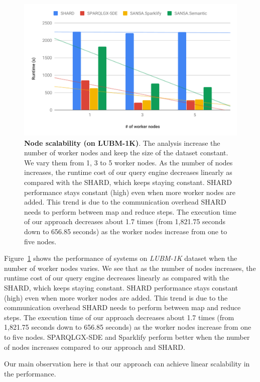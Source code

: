 \begin{figure}
  \includegraphics[width=1.0\columnwidth]{images/6_scalable_rdf_querying/semantic-based-node-scalability.pdf}
    \caption{\textbf{Node scalability (on LUBM-1K)}.
     The analysis increase the number of worker nodes and keep the size of the dataset constant. 
    We vary them from 1, 3 to 5 worker nodes.
    As the number of nodes increases, the runtime cost of our query engine decreases linearly as compared with the SHARD, which keeps staying constant. 
    SHARD performance stays constant (high) even when more worker nodes are added. This trend is due to the communication overhead SHARD needs to perform between map and reduce steps. The execution time of our approach decreases about 1.7 times (from 1,821.75 seconds down to 656.85 seconds) as the worker nodes increase from one to five nodes.}
    \label{fig:semantic-based-node-scalability}
\end{figure}

Figure~\ref{fig:semantic-based-node-scalability} shows the performance of systems on \textit{LUBM-1K} dataset when the number of worker nodes varies.
We see that as the number of nodes increases, the runtime cost of our query engine decreases linearly as compared with the SHARD, which keeps staying constant.
SHARD performance stays constant (high) even when more worker nodes are added.
This trend is due to the communication overhead SHARD needs to perform between map and reduce steps.
The execution time of our approach decreases about 1.7 times (from 1,821.75 seconds down to 656.85 seconds) as the worker nodes increase from one to five nodes.
SPARQLGX-SDE and Sparklify perform better when the number of nodes increases compared to our approach and SHARD. 

Our main observation here is that our approach can achieve linear scalability in the performance.

